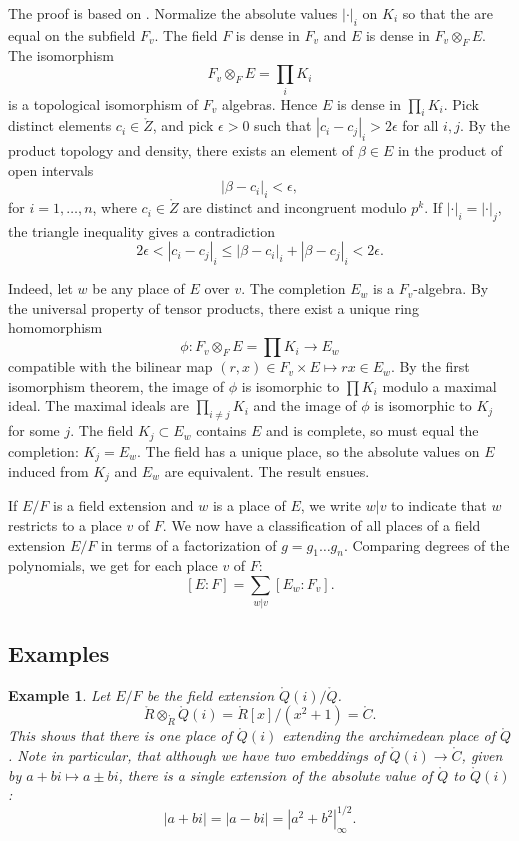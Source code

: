 \documentclass{amsart}
\newtheorem{example}[exercise]{Example}
\def\abs#1{{|#1|}}
\begin{document}
  The proof
is based on . Normalize
the absolute values $\abs{\cdot}_i$ on $K_i$  so that the are equal on the
subfield $F_v$.  The field $F$ is dense in $F_v$ and $E$ is dense
in $F_v\otimes_F E$.  The isomorphism
\[
F_v\otimes_F E = \prod_i K_i
\]
is a topological isomorphism of $F_v$ algebras.  Hence $E$ is
dense in $\prod_i K_i$.  Pick distinct elements $c_i\in\ring{Z}$,
and pick $\epsilon>0$ such that $\abs{c_i-c_j}_i > 2\epsilon$ for all $i,j$.
By the product topology and density, there exists an
element of $\beta\in E$ in the product of open intervals
\[
\abs{\beta-c_i}_i< \epsilon,
\]
for $i=1,\ldots,n$,
where $c_i\in\ring{Z}$ are distinct and incongruent modulo $p^k$.
If $\abs{\cdot}_i = \abs{\cdot}_j$, the triangle inequality gives a contradiction
\[
2\epsilon < \abs{c_i-c_j}_i \le \abs{\beta-c_i}_i + \abs{\beta-c_j}_i < 2\epsilon.
\]

  Indeed, let $w$ be any place of $E$ over $v$.
The completion $E_w$ is a $F_v$-algebra.  By the universal property
of tensor products, there exist a unique ring homomorphism 
\[
\phi:F_v\otimes_F E =\prod K_i \to E_w
\]
compatible with the bilinear map $(r,x)\in F_v\times E \mapsto r x\in E_w$.
By the first isomorphism theorem, the image of $\phi$ is isomorphic
to $\prod K_i$ modulo a maximal ideal.  The maximal ideals
are $\prod_{i\ne j} K_i$ and the image of $\phi$ is isomorphic to $K_j$ for
some $j$.  The field $K_j\subset E_w$ contains $E$ and is complete,
so must equal the completion: $K_j = E_w$.  The field has a unique place,
so the absolute values on $E$ induced from $K_j$ and $E_w$ are equivalent.
The result ensues.

If $E/F$ is a field extension and
$w$ is a place of $E$, we write $w|v$ to indicate that $w$ restricts
to a place $v$ of $F$.
We now have a classification of all places of a field extension $E/F$ in
terms of a factorization of $g = g_1\ldots g_n$. Comparing degrees of
the polynomials, we get for each place $v$ of $F$:
\[
[E:F] = \sum_{w|v} [E_w:F_v].
\]

\subsection{Examples}

\begin{example}  Let $E/F$ be the field extension $\ring{Q}(i)/\ring{Q}$.
\[
\ring{R}\otimes_\ring{R} \ring{Q}(i) = \ring{R}[x]/(x^2+1) = \ring{C}.
\]
This shows that there is one place of $\ring{Q}(i)$ extending the archimedean
place of $\ring{Q}$.  Note in particular, that although we have two embeddings
of $\ring{Q}(i)\to\ring{C}$, given by $a+bi \mapsto a \pm b i$, there is a single
extension of the absolute value of $\ring{Q}$ to $\ring{Q}(i)$:
\[
\abs{a + bi } = \abs{a - bi} = \abs{a^2 + b^2}^{1/2}_\infty.
\]
\end{example}
\end{document}
